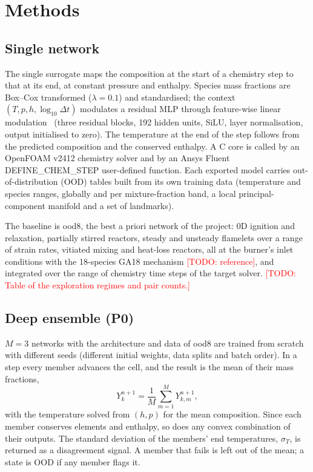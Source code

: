 \documentclass[preprint,review,12pt]{elsarticle}
\newcommand{\todo}[1]{\textcolor{red}{[TODO: #1]}}
\begin{document}
\section{Methods}
\label{sec:methods}

\subsection{Single network}
\label{sec:single}
The single surrogate maps the composition at the start of a chemistry step to that at its end, at
constant pressure and enthalpy. Species mass fractions are Box--Cox transformed ($\lambda=0.1$) and
standardised; the context $(T,p,h,\log_{10}\Delta t)$ modulates a residual MLP through feature-wise linear
modulation~\cite{perez2018film} (three residual blocks, 192 hidden units, SiLU, layer normalisation, output
initialised to zero). The temperature at the end of the step follows from the predicted composition and
the conserved enthalpy. A C core is called by an OpenFOAM v2412 chemistry solver and by an Ansys Fluent
DEFINE\_CHEM\_STEP user-defined function. Each exported model carries out-of-distribution (OOD) tables
built from its own training data (temperature and species ranges, globally and per mixture-fraction band,
a local principal-component manifold and a set of landmarks).

The baseline is ood8, the best a priori network of the project: 0D ignition and relaxation, partially
stirred reactors, steady and unsteady flamelets over a range of strain rates, vitiated mixing and
heat-loss reactors, all at the burner's inlet conditions with the 18-species GA18 mechanism
\todo{reference}, and integrated over the range of chemistry time steps of the target solver.
\todo{Table of the exploration regimes and pair counts.}

\subsection{Deep ensemble (P0)}
\label{sec:p0}
$M=3$ networks with the architecture and data of ood8 are trained from scratch with different seeds
(different initial weights, data splits and batch order). In a step every member advances the cell, and
the result is the mean of their mass fractions,
\begin{equation}
  Y_k^{n+1} = \frac{1}{M}\sum_{m=1}^{M} Y_{k,m}^{n+1},
\end{equation}
with the temperature solved from $(h,p)$ for the mean composition. Since each member conserves elements
and enthalpy, so does any convex combination of their outputs. The standard deviation of the members'
end temperatures, $\sigma_T$, is returned as a disagreement signal. A member that fails is left out of the
mean; a state is OOD if any member flags it.
\end{document}
